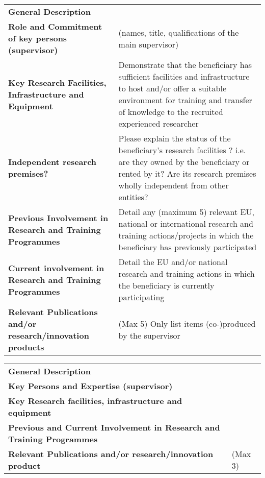 \documentclass[a4paper,11pt]{article}
\begin{document}
{\fontsize{9bp}{1em}\selectfont %
\noindent\begin{tabular}{>{\raggedright}p{}p{}}
  \multicolumn{2}{l}{\textbf{Beneficiary X}} \\\midrule
\textbf{General Description} &

\\\midrule
\textbf{Role and Commitment of key persons (supervisor)} &
(names, title, qualifications of the main supervisor)
\\\midrule
\textbf{Key Research Facilities, Infrastructure and Equipment} &
Demonstrate that the beneficiary has sufficient facilities and infrastructure to host and/or offer a suitable environment for training and transfer of knowledge to the recruited experienced researcher
\\\midrule
\textbf{Independent research premises?} &
Please explain the status of the beneficiary's research facilities ? i.e. are they owned by the beneficiary or rented by it? Are its research premises wholly independent from other entities?

\\\midrule
\textbf{Previous Involvement in Research and Training Programmes} &
Detail any (maximum 5) relevant EU, national or international research and training actions/projects in which the beneficiary has previously participated

\\\midrule
\textbf{Current involvement in Research and Training Programmes} &
Detail the EU and/or national research and training actions in which the beneficiary is currently participating

\\\midrule
\textbf{Relevant Publications and/or research/innovation products} &
(Max 5) Only list items (co-)produced by the supervisor

\\\bottomrule
\end{tabular}}
\vspace{\baselineskip}

{\fontsize{9bp}{1em}\selectfont
\noindent\begin{tabular}{>{\raggedright}p{}p{}}
  \multicolumn{2}{l}{\textbf{Partner Organisation Y}} \\\midrule
\textbf{General Description} &

\\\midrule
\textbf{Key Persons and Expertise (supervisor)} &

\\\midrule
\textbf{Key Research facilities, infrastructure and equipment} &

\\\midrule
\textbf{Previous and Current Involvement in Research and Training Programmes} &

\\\midrule
\textbf{Relevant Publications and/or research/innovation product} &
(Max 3)
\\\bottomrule
\end{tabular}}
\end{document}
